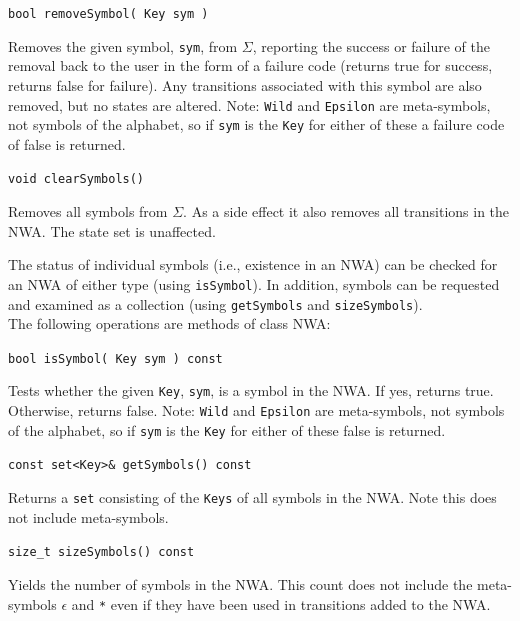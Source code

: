 \documentclass{llncs}
\begin{document}
\begin{description}

  \item\texttt{bool removeSymbol( Key sym )}

    Removes the given symbol, \texttt{sym}, from $\Sigma$, reporting the success or failure of the removal back to the user in the form of a failure code (returns true for success, returns false for failure).  Any transitions associated with this symbol are also removed, but no states are altered.  Note: \texttt{Wild} and \texttt{Epsilon} are meta-symbols, not symbols of the alphabet, so if \texttt{sym} is the \texttt{Key} for either of these a failure code of false is returned. 

  \item\texttt{void clearSymbols()}

    Removes all symbols from $\Sigma$.  As a side effect it also removes all transitions in the NWA.  The state set is unaffected. \\

\end{description}

The status of individual symbols (i.e., existence in an NWA) can be checked for an NWA of either type (using \texttt{isSymbol}).  In addition, symbols can be requested and examined as a collection (using \texttt{getSymbols} and \texttt{sizeSymbols}). \\

\noindent The following operations are methods of class NWA:

\begin{description}

  \item\texttt{bool isSymbol( Key sym ) const}

    Tests whether the given \texttt{Key}, \texttt{sym}, is a symbol in the NWA.  If yes, returns true.  Otherwise, returns false.  Note: \texttt{Wild} and \texttt{Epsilon} are meta-symbols, not symbols of the alphabet, so if \texttt{sym} is the \texttt{Key} for either of these false is returned.

  \item\texttt{const set<Key>\& getSymbols() const}

    Returns a \texttt{set} consisting of the \texttt{Keys} of all symbols in the NWA.  Note this does not include meta-symbols.

  \item\texttt{size\_t sizeSymbols() const}

    Yields the number of symbols in the NWA.  This count does not include the meta-symbols \texttt{$\epsilon$} and \texttt{*} even if they have been used in transitions added to the NWA. \\

\end{description}
\end{document}
